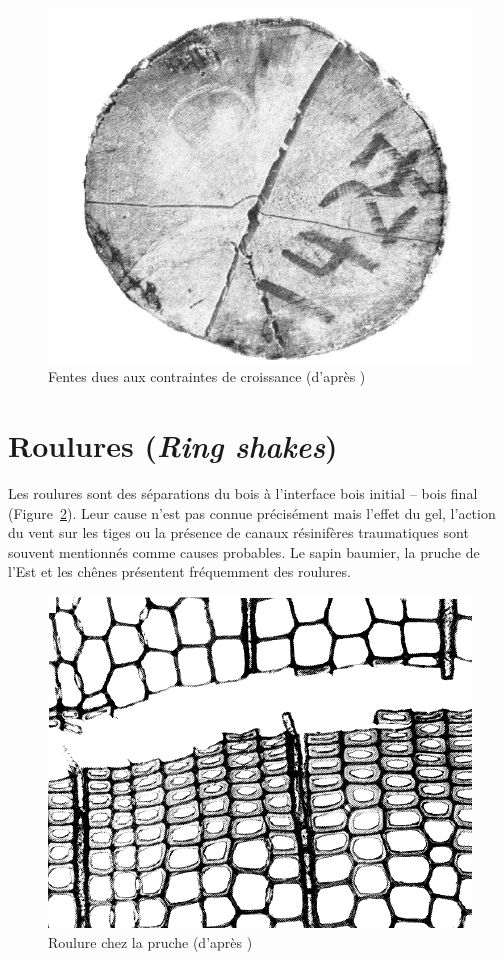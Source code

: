 \begin{figure}[h]
	\centering
	\includegraphics[scale=0.5]{img/ch9_contraintes}
	\caption{Fentes dues aux contraintes de croissance (d'après \cite{panshin1980textbook})}
	\label{fig:contraintes}
\end{figure}

\section{Roulures (\textit{Ring shakes})}

Les roulures sont des séparations du bois à l'interface bois initial -- bois final (Figure~\ref{fig:shake}). Leur cause n'est pas connue précisément mais l'effet du gel, l'action du vent sur les tiges ou la présence de canaux résinifères traumatiques sont souvent mentionnés comme causes probables. Le sapin baumier, la pruche de l'Est et les chênes présentent fréquemment des roulures.

\begin{figure}[h]
	\centering
	\includegraphics[scale=0.55]{img/ch9_shake}
	\caption{Roulure chez la pruche (d'après \cite{panshin1980textbook})}
	\label{fig:shake}
\end{figure}

